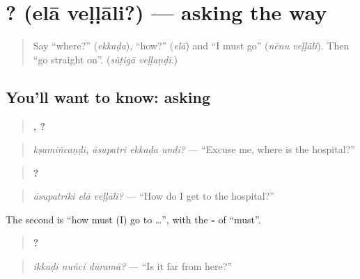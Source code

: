 \section[\texorpdfstring{\te{ఎలా} \te{వెళ్ళాలి}? (elā veḷḷāli?)}{ఎలా వెళ్ళాలి? (elā veḷḷāli?)}]{ ? (elā veḷḷāli?) — asking the way}

\label{lesson:TE-C320-ela-vellali}



\begin{quote}
Say \textquotedblleft{}where?\textquotedblright{} (\emph{ekkaḍa}), \textquotedblleft{}how?\textquotedblright{} (\emph{elā}) and \textquotedblleft{}I must go\textquotedblright{} (\emph{nēnu veḷḷāli}). Then \textquotedblleft{}go straight on\textquotedblright{}. (\emph{sūṭigā veḷḷaṇḍi}.)
\end{quote}

\subsection*{You'll want to know: asking}
\begin{quote}
\textbf{,   ?}
\end{quote}

\begin{quote}
\emph{kṣamiñcaṇḍi, āsupatri ekkaḍa undi?} — \textquotedblleft{}Excuse me, where is the hospital?\textquotedblright{}
\end{quote}

\begin{quote}
\textbf{  ?}
\end{quote}

\begin{quote}
\emph{āsupatriki elā veḷḷāli?} — \textquotedblleft{}How do I get to the hospital?\textquotedblright{}
\end{quote}

The second is \textquotedblleft{}how must (I) go to …\textquotedblright{}, with the \textbf{-} of \textquotedblleft{}must\textquotedblright{}.

\begin{quote}
\textbf{  ?}
\end{quote}

\begin{quote}
\emph{ikkaḍi nuñci dūramā?} — \textquotedblleft{}Is it far from here?\textquotedblright{}
\end{quote}

